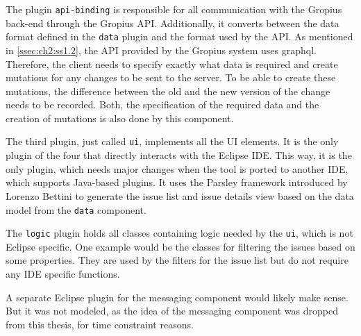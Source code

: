 The plugin \lstinline|api-binding| is responsible for all communication with the \gls{Gropius} back-end through the \gls{Gropius} \gls{API}.
Additionally, it converts between the data format defined in the \lstinline|data| plugin and the format used by the \gls{API}.
As mentioned in \cref{ssec:ch2:ss1.2}, the \gls{API} provided by the Gropius system uses \gls{graphql}.
Therefore, the client needs to specify exactly what data is required and create mutations for any changes to be sent to the server.
To be able to create these mutations, the difference between the old and the new version of the change needs to be recorded.
Both, the specification of the required data and the creation of mutations is also done by this component.

The third plugin, just called \lstinline|ui|, implements all the \gls{UI} elements.
It is the only plugin of the four that directly interacts with the \gls{Eclipse} \gls{IDE}.
This way, it is the only plugin, which needs major changes when the tool is ported to another \gls{IDE}, which supports Java-based plugins.
It uses the \gls{Parsley} framework introduced by Lorenzo Bettini \cite{bettini2014developing} to generate the issue list and issue details view 
based on the data model from the \lstinline|data| component.

The \lstinline|logic| plugin holds all classes containing logic needed by the \lstinline|ui|, which is not \gls{Eclipse} specific.
One example would be the classes for filtering the issues based on some properties.
They are used by the filters for the issue list but do not require any \gls{IDE} specific functions.

A separate \gls{Eclipse} plugin for the messaging component would likely make sense.
But it was not modeled, as the idea of the messaging component was dropped from this thesis, for time constraint reasons.

